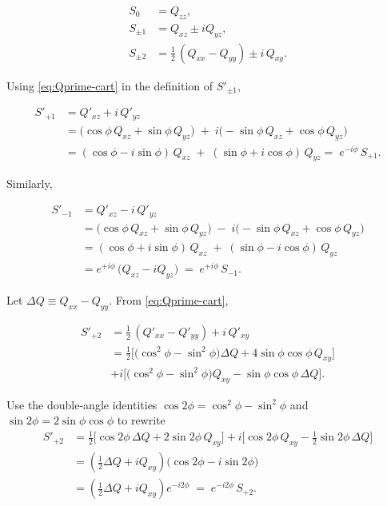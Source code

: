 \begin{equation}
\begin{aligned}
S_0 &= Q_{zz},\\
S_{\pm1} &= Q_{xz}\pm iQ_{yz},\\
S_{\pm2} &= \tfrac12\,(Q_{xx}-Q_{yy}) \pm i\,Q_{xy}.
\end{aligned}
\label{eq:Q-spherical-def}
\end{equation}

Using \ref{eq:Qprime-cart} in the definition of $S'_{\pm1}$,

\begin{equation}
\begin{aligned}
S'_{+1}
&= Q'_{xz}+i\,Q'_{yz}\\
&= \big(\cos\phi\,Q_{xz}+\sin\phi\,Q_{yz}\big)\;+\;i\big(-\sin\phi\,Q_{xz}+\cos\phi\,Q_{yz}\big)\\
&= (\cos\phi - i\sin\phi)\,Q_{xz}\;+\;(\sin\phi + i\cos\phi)\,Q_{yz} =\; e^{-i\phi}\,S_{+1}.
\end{aligned}
\end{equation}

Similarly,

\begin{equation}
\begin{aligned}
S'_{-1}
&= Q'_{xz}-i\,Q'_{yz}\\
&= \big(\cos\phi\,Q_{xz}+\sin\phi\,Q_{yz}\big)\;-\;i\big(-\sin\phi\,Q_{xz}+\cos\phi\,Q_{yz}\big)\\
&= (\cos\phi + i\sin\phi)\,Q_{xz}\;+\;(\sin\phi - i\cos\phi)\,Q_{yz}\\
&= e^{+i\phi}\,\big(Q_{xz}-iQ_{yz}\big) \;=\; e^{+i\phi}\,S_{-1}.
\end{aligned}
\end{equation}

Let $\Delta Q \equiv Q_{xx}-Q_{yy}$. From \eqref{eq:Qprime-cart},

\begin{equation}
\begin{aligned}
S'_{+2}
&= \tfrac12\,(Q'_{xx}-Q'_{yy}) + i\,Q'_{xy}\\
&= \tfrac12\Big[\big(\cos^2\!\phi-\sin^2\!\phi\big)\Delta Q  + 4\sin\phi\cos\phi\,Q_{xy}\Big]\\
&+ i\Big[\big(\cos^2\!\phi-\sin^2\!\phi\big)Q_{xy} - \sin\phi\cos\phi\,\Delta Q \Big].
\end{aligned}
\end{equation}

Use the double-angle identities $\cos 2\phi=\cos^2\!\phi-\sin^2\!\phi$ and $\sin 2\phi=2\sin\phi\cos\phi$ to rewrite
\begin{equation}
\begin{aligned}
S'_{+2}
&= \tfrac12\Big[\cos 2\phi\,\Delta Q  + 2\sin 2\phi\,Q_{xy}\Big]
+ i\Big[\cos 2\phi\,Q_{xy} - \tfrac12\sin 2\phi\,\Delta Q \Big]\\[4pt]
&= \left(\tfrac12\Delta Q  + iQ_{xy}\right)\big(\cos 2\phi - i\sin 2\phi\big)\\[4pt]
&= \left(\tfrac12\Delta Q  + iQ_{xy}\right) e^{-i2\phi}
\;=\; e^{-i2\phi}\,S_{+2}.
\end{aligned}
\end{equation}

